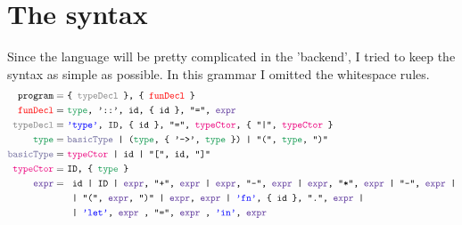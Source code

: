 \documentclass{article}
\begin{document}
\section{The syntax}
Since the language will be pretty complicated in the 'backend', I tried to keep the syntax as simple as possible. In this grammar I omitted the whitespace rules.
\begin{align*}
\texttt{program}  =\ & \texttt{\{ \color{gray}typeDecl \color{black} \}, \{ \color{red}funDecl \color{black} \}}\\
\texttt{\color{red}funDecl\color{black}} =\ & \texttt{\color{ForestGreen}type\color{black}, '::', id, \{ id \}, "=", \color{RoyalPurple}expr\color{black}}\\
\texttt{\color{gray}typeDecl\color{black}} =\ &\texttt{\color{blue}'type'\color{black}, ID, \{ id \}, "=", \color{RubineRed}typeCtor\color{black}, \{ "|", \color{RubineRed}typeCtor \color{black} \}}\\
\texttt{\color{ForestGreen}type\color{black}} =\ &\texttt{\color{CadetBlue}basicType \color{black} | (\color{ForestGreen}type\color{black}, \{ '->', \color{ForestGreen}type \color{black} \}) | "(", \color{ForestGreen}type\color{black}, ")"}\\
\texttt{\color{CadetBlue}basicType} =\ &	\texttt{\color{RubineRed}typeCtor \color{black}| id | "[", id, "]"}\\
\texttt{\color{RubineRed}typeCtor\color{black}} =\ & \texttt{ID, \{ \color{ForestGreen}type \color{black} \}}\\
\texttt{\color{RoyalPurple}expr\color{black}} =\ &  \texttt{
	id
	| ID
	| \color{RoyalPurple}expr\color{black}, "+", \color{RoyalPurple}expr \color{black} 
	| \color{RoyalPurple}expr\color{black}, "-", \color{RoyalPurple}expr \color{black} 
	| \color{RoyalPurple}expr\color{black}, "*", \color{RoyalPurple}expr \color{black}
	| "-", \color{RoyalPurple}expr \color{black}
|}\\
&\texttt{
	| "(", \color{RoyalPurple}expr\color{black}, ")" 
	| \color{RoyalPurple}expr\color{black}, \color{RoyalPurple}expr \color{black} 
	| \color{blue}'fn'\color{black}, \{ id \}, ".", \color{RoyalPurple}expr \color{black} 
|}\\
&\texttt{
	| \color{blue}'let'\color{black}, 
	\color{RoyalPurple}expr \color{black}, "=",	\color{RoyalPurple}expr \color{black},	 \color{blue}'in'\color{black}, \color{RoyalPurple}expr \color{black} 
}
\end{align*}
\end{document}
